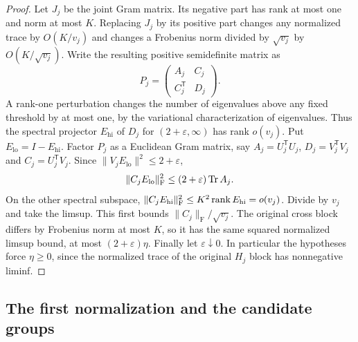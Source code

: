 \begin{proof}
Let $J_j$ be the joint Gram matrix.  Its negative part has rank at most
one and norm at most $K$.  Replacing $J_j$ by its positive part changes
any normalized trace by $O(K/v_j)$ and changes a Frobenius norm divided
by $\sqrt{v_j}$ by $O(K/\sqrt{v_j})$.  Write the resulting positive
semidefinite matrix as
\[
 P_j=\begin{pmatrix}A_j&C_j\\ C_j^{\mathsf T}&D_j\end{pmatrix}.
\]
A rank-one perturbation changes the number of eigenvalues above any
fixed threshold by at most one, by the variational characterization of
eigenvalues.  Thus the spectral projector $E_{\mathrm{hi}}$ of $D_j$
for $(2+\varepsilon,\infty)$ has rank $o(v_j)$.  Put
$E_{\mathrm{lo}}=I-E_{\mathrm{hi}}$.  Factor $P_j$ as a Euclidean
Gram matrix, say $A_j=U_j^{\mathsf T}U_j$,
$D_j=V_j^{\mathsf T}V_j$ and $C_j=U_j^{\mathsf T}V_j$.
Since $\|V_jE_{\mathrm{lo}}\|^2\le2+\varepsilon$,
\[
 \|C_jE_{\mathrm{lo}}\|_{\mathrm F}^2
 \le(2+\varepsilon)\operatorname{Tr} A_j.
\]
On the other spectral subspace,
$\|C_jE_{\mathrm{hi}}\|_{\mathrm F}^2\le K^2
\operatorname{rank} E_{\mathrm{hi}}=o(v_j)$.  Divide by $v_j$ and take the
limsup.  This first bounds $\|C_j\|_{\mathrm F}/\sqrt{v_j}$.
The original cross block differs by Frobenius norm at most $K$,
so it has the same squared normalized limsup bound, at most
$(2+\varepsilon)\eta$.  Finally let
$\varepsilon\downarrow0$.  In particular the hypotheses force
$\eta\ge0$, since the normalized trace of the original $H_j$ block
has nonnegative liminf.
\end{proof}

\subsection{The first normalization and the candidate groups}

